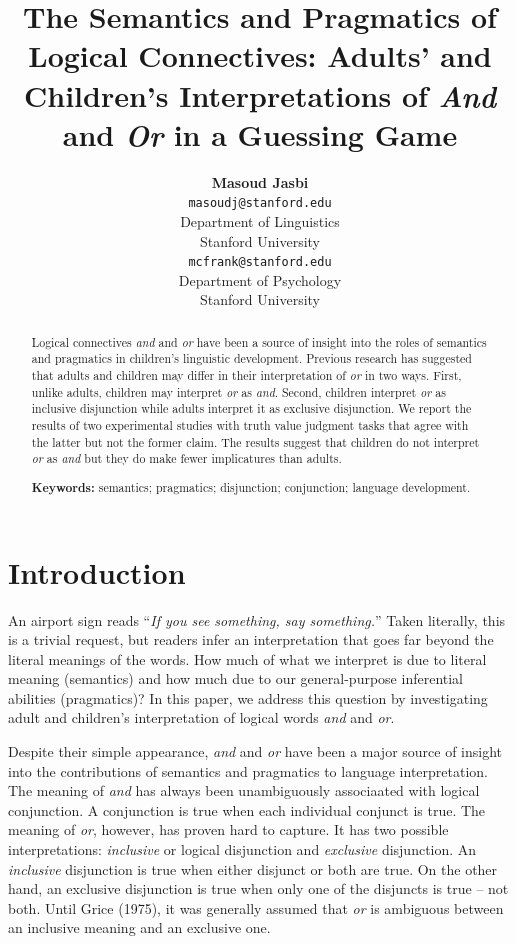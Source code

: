 \documentclass[10pt, letterpaper]{article}
\title{The Semantics and Pragmatics of Logical Connectives: Adults' and
Children's Interpretations of \emph{And} and \emph{Or} in a Guessing
Game}
\author{{\large \bf Masoud Jasbi} \\ \texttt{masoudj@stanford.edu} \\ Department of Linguistics \\ Stanford University \And {\large \bf Michael C. Frank} \\ \texttt{mcfrank@stanford.edu} \\ Department of Psychology \\ Stanford University}
\begin{document}
\maketitle

\begin{abstract}
Logical connectives \emph{and} and \emph{or} have been a source of
insight into the roles of semantics and pragmatics in children's
linguistic development. Previous research has suggested that adults and
children may differ in their interpretation of \emph{or} in two ways.
First, unlike adults, children may interpret \emph{or} as \emph{and}.
Second, children interpret \emph{or} as inclusive disjunction while
adults interpret it as exclusive disjunction. We report the results of
two experimental studies with truth value judgment tasks that agree with
the latter but not the former claim. The results suggest that children
do not interpret \emph{or} as \emph{and} but they do make fewer
implicatures than adults.

\textbf{Keywords:}
semantics; pragmatics; disjunction; conjunction; language development.
\end{abstract}

\section{Introduction}\label{introduction}

An airport sign reads ``\emph{If you see something, say something.}''
Taken literally, this is a trivial request, but readers infer an
interpretation that goes far beyond the literal meanings of the words.
How much of what we interpret is due to literal meaning (semantics) and
how much due to our general-purpose inferential abilities (pragmatics)?
In this paper, we address this question by investigating adult and
children's interpretation of logical words \emph{and} and \emph{or}.

Despite their simple appearance, \emph{and} and \emph{or} have been a
major source of insight into the contributions of semantics and
pragmatics to language interpretation. The meaning of \emph{and} has
always been unambiguously associaated with logical conjunction. A
conjunction is true when each individual conjunct is true. The meaning
of \emph{or}, however, has proven hard to capture. It has two possible
interpretations: \emph{inclusive} or logical disjunction and
\emph{exclusive} disjunction. An \emph{inclusive} disjunction is true
when either disjunct or both are true. On the other hand, an exclusive
disjunction is true when only one of the disjuncts is true -- not both.
Until Grice (1975), it was generally assumed that \emph{or} is ambiguous
between an inclusive meaning and an exclusive one.
\end{document}
